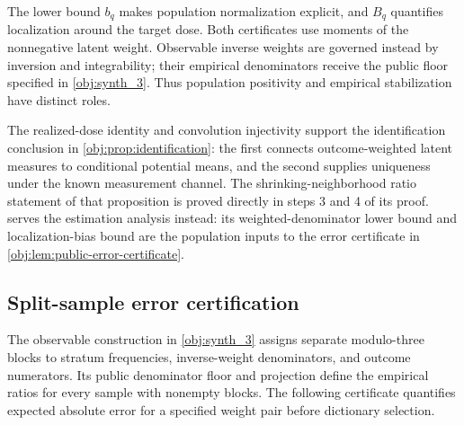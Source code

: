 The lower bound \(b_q\) makes population normalization explicit, and \(B_q\) quantifies localization around the target dose. Both certificates use moments of the nonnegative latent weight. Observable inverse weights are governed instead by inversion and integrability; their empirical denominators receive the public floor specified in \cref{obj:synth_3}. Thus population positivity and empirical stabilization have distinct roles.

The realized-dose identity and convolution injectivity support the identification conclusion in \cref{obj:prop:identification}: the first connects outcome-weighted latent measures to conditional potential means, and the second supplies uniqueness under the known measurement channel. The shrinking-neighborhood ratio statement of that proposition is proved directly in steps 3 and 4 of its proof.  serves the estimation analysis instead: its weighted-denominator lower bound and localization-bias bound are the population inputs to the error certificate in \cref{obj:lem:public-error-certificate}.

\subsection{Split-sample error certification}

The observable construction in \cref{obj:synth_3} assigns separate modulo-three blocks to stratum frequencies, inverse-weight denominators, and outcome numerators. Its public denominator floor and projection define the empirical ratios for every sample with nonempty blocks. The following certificate quantifies expected absolute error for a specified weight pair before dictionary selection.

